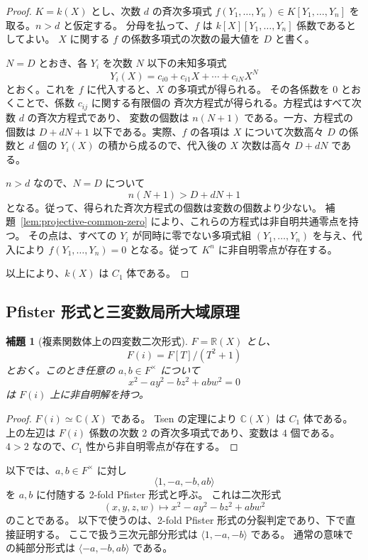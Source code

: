 \documentclass[uplatex,dvipdfmx]{jsarticle}
\theoremstyle{matrixsosdefinition}
\newtheorem{lemma}[theorem]{補題}
\begin{document}
\begin{proof}
  \(K=k(X)\) とし、次数 \(d\) の斉次多項式
  \(f(Y_1,\ldots,Y_n)\in K[Y_1,\ldots,Y_n]\) を取る。\(n>d\) と仮定する。
  分母を払って、\(f\) は \(k[X][Y_1,\ldots,Y_n]\) 係数であるとしてよい。
  \(X\) に関する \(f\) の係数多項式の次数の最大値を \(D\) と書く。

  \(N=D\) とおき、各 \(Y_i\) を次数 \(N\) 以下の未知多項式
  \[
    Y_i(X)=c_{i0}+c_{i1}X+\cdots+c_{iN}X^N
  \]
  とおく。これを \(f\) に代入すると、\(X\) の多項式が得られる。
  その各係数を \(0\) とおくことで、係数 \(c_{ij}\) に関する有限個の
  斉次方程式が得られる。方程式はすべて次数 \(d\) の斉次方程式であり、
  変数の個数は \(n(N+1)\) である。一方、方程式の個数は
  \(D+dN+1\) 以下である。実際、\(f\) の各項は \(X\) について次数高々 \(D\) の係数と
  \(d\) 個の \(Y_i(X)\) の積から成るので、代入後の \(X\) 次数は高々 \(D+dN\) である。

  \(n>d\) なので、\(N=D\) について
  \[
    n(N+1)>D+dN+1
  \]
  となる。従って、得られた斉次方程式の個数は変数の個数より少ない。
  補題~\ref{lem:projective-common-zero} により、これらの方程式は非自明共通零点を持つ。
  その点は、すべての \(Y_i\) が同時に零でない多項式組
  \((Y_1,\ldots,Y_n)\) を与え、代入により
  \(f(Y_1,\ldots,Y_n)=0\) となる。従って \(K^n\) に非自明零点が存在する。

  以上により、\(k(X)\) は \(C_1\) 体である。
\end{proof}

\subsection{Pfister 形式と三変数局所大域原理}

\begin{lemma}[複素関数体上の四変数二次形式]\label{lem:complex-function-field-four-variable-quadratic}
  \(F=\mathbb{R}(X)\) とし、
  \[
    F(i)=F[T]/(T^2+1)
  \]
  とおく。このとき任意の \(a,b\in F^\times\) について
  \[
    x^2-a y^2-b z^2+ab w^2=0
  \]
  は \(F(i)\) 上に非自明解を持つ。
\end{lemma}

\begin{proof}
  \(F(i)\simeq\mathbb{C}(X)\) である。
  Tsen の定理により \(\mathbb{C}(X)\) は \(C_1\) 体である。
  上の左辺は \(F(i)\) 係数の次数 \(2\) の斉次多項式であり、変数は \(4\) 個である。
  \(4>2\) なので、\(C_1\) 性から非自明零点が存在する。
\end{proof}

以下では、\(a,b\in F^\times\) に対し
\[
  \langle 1,-a,-b,ab\rangle
\]
を \(a,b\) に付随する 2-fold Pfister 形式と呼ぶ。
これは二次形式
\[
  (x,y,z,w)\longmapsto x^2-a y^2-b z^2+ab w^2
\]
のことである。
以下で使うのは、2-fold Pfister 形式の分裂判定であり、下で直接証明する。
ここで扱う三次元部分形式は \(\langle 1,-a,-b\rangle\) である。
通常の意味での純部分形式は \(\langle-a,-b,ab\rangle\) である。
\end{document}
